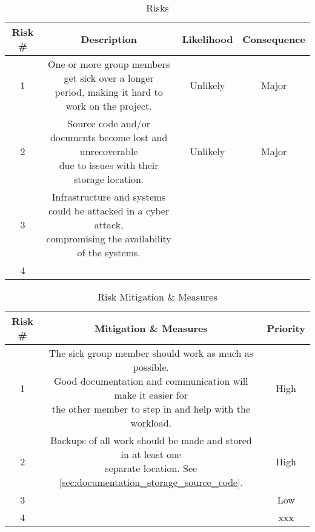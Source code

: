\begin{table}[H]
    \centering
    \begin{tabular}{|c|c|c|c|}
    \hline
    Risk \# & Description & Likelihood & Consequence \\
    \hline
    1 & \makecell{One or more group members get sick over a longer \\period, making it hard to work on the project.} & Unlikely \cellcolor[HTML]{ffC300} & Major \cellcolor[HTML]{ffC300} \\
    \hline
    2 & \makecell{Source code and/or documents become lost and unrecoverable \\due to  issues with their storage location.} & Unlikely \cellcolor[HTML]{ffC300} & Major \cellcolor[HTML]{ffC300} \\
    \hline
    3 & \makecell{Infrastructure and systems could be attacked in a cyber attack, \\compromising the availability of the systems. } & \cellcolor[HTML]{74ff00} & \cellcolor[HTML]{74ff00} \\
    \hline
    4 & & \cellcolor[HTML]{74ff00} & \cellcolor[HTML]{74ff00} \\
    \hline
    \end{tabular}
    \caption{Risks}
    \label{tab:risks}
\end{table}

\begin{table}[H]
    \centering
    \begin{tabular}{|c|c|c|}
    \hline
    Risk \# & Mitigation \& Measures & Priority \\
    \hline
    1 & \makecell{The sick group member should work as much as possible. \\ Good documentation and communication will make it easier for \\ the other member to step in and help with the workload.} & High \cellcolor[HTML]{ff4233} \\
    \hline
    2 & \makecell{Backups of all work should be made and stored in at least one \\separate location. See \ref{sec:documentation_storage_source_code}.} & High \cellcolor[HTML]{ff4233} \\
    \hline
    3 & & Low \cellcolor[HTML]{fff000} \\
    \hline
    4 & & xxx \cellcolor[HTML]{74ff00} \\
    \hline
    \end{tabular}
    \caption{Risk Mitigation \& Measures}
    \label{tab:risk_mitigation}
\end{table}